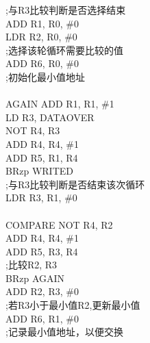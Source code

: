 \documentclass[12pt]{ctexart}
\begin{document}
\hspace*{1.5cm};与R3比较判断是否选择结束\\
\hspace*{1.5cm}ADD R1, R0, \#0\\
\hspace*{1.5cm}LDR R2, R0, \#0\\
\hspace*{1.5cm};选择该轮循环需要比较的值\\
\hspace*{1.5cm}ADD R6, R0, \#0\\
\hspace*{1.5cm};初始化最小值地址\\
\\
AGAIN   ADD R1, R1, \#1\\
\hspace*{1.5cm}LD R3, DATAOVER\\
\hspace*{1.5cm}NOT R4, R3\\
\hspace*{1.5cm}ADD R4, R4, \#1\\
\hspace*{1.5cm}ADD R5, R1, R4\\
\hspace*{1.5cm}BRzp WRITED\\
\hspace*{1.5cm};与R3比较判断是否结束该次循环\\
\hspace*{1.5cm}LDR R3, R1, \#0\\
\\
COMPARE NOT R4, R2\\
\hspace*{1.5cm}ADD R4, R4, \#1\\
\hspace*{1.5cm}ADD R5, R3, R4\\
\hspace*{1.5cm};比较R2, R3\\
\hspace*{1.5cm}BRzp AGAIN\\
\hspace*{1.5cm}ADD R2, R3, \#0\\
\hspace*{1.5cm};若R3小于最小值R2,更新最小值\\
\hspace*{1.5cm}ADD R6, R1, \#0\\
\hspace*{1.5cm};记录最小值地址，以便交换\\
\end{document}
